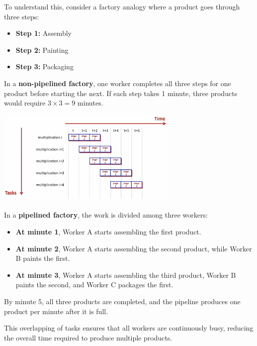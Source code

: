 To understand this, consider a factory analogy where a product goes through three steps:
\begin{itemize}
    \item[] \textbf{Step 1:} Assembly
    \item[] \textbf{Step 2:} Painting
    \item[] \textbf{Step 3:} Packaging
\end{itemize}

In a \textbf{non-pipelined factory}, one worker completes all three steps for one product before starting the next. If each step takes 1 minute, three products would require \( 3 \times 3 = 9 \) minutes.

\hspace{-10px}
\begin{center}
    \includegraphics[width=0.65\textwidth]{chapters/chapter4b/images/parallel.png}
\end{center}
In a \textbf{pipelined factory}, the work is divided among three workers:
\begin{itemize}
    \item[] \textbf{At minute 1}, Worker A starts assembling the first product.
    \item[] \textbf{At minute 2}, Worker A starts assembling the second product, while Worker B paints the first.
    \item[] \textbf{At minute 3}, Worker A starts assembling the third product, Worker B paints the second, and Worker C packages the first.
\end{itemize}
By minute 5, all three products are completed, and the pipeline produces one product per minute after it is full.

This overlapping of tasks ensures that all workers are continuously busy, reducing the overall time required to produce multiple products.

